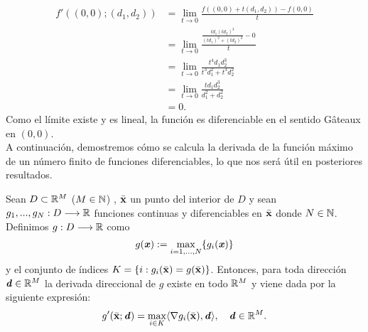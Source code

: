 \begin{equation*}
\begin{split}
f'((0,0); (d_1, d_2)) &= \lim_{t\rightarrow0}\frac{f((0,0)+t(d_1, d_2)) - f(0,0)}{t} \\
&=  \lim_{t\rightarrow0}\frac{\frac{td_1(td_2)^3}{(td_1)^2+(td_2)^2} - 0}{t} \\
&= \lim_{t\rightarrow0}\frac{t^4d_1d_2^3}{t^3d_1^2+t^3d_2^2} \\
&= \lim_{t\rightarrow0}\frac{td_1d_2^3}{d_1^2+d_2^2} \\
& = 0.
\end{split}
\end{equation*}
Como el límite existe y es lineal, la función es diferenciable en el sentido Gâteaux en $ (0,0) $. \\

A continuación, demostremos cómo se calcula la derivada de la función máximo de un número finito de funciones diferenciables, lo que nos será útil en posteriores resultados.
\bigskip
	\begin{proposicionBox}\label{dirDeriv}
		Sean $ D \subset \mathbb{R}^M$ ($ M \in \mathbb{N} $) , $ \bar{\mathbf{x}} $ un punto del interior de $ D $ y sean $ g_1, ..., g_N : D \longrightarrow \mathbb{R} $  funciones continuas y diferenciables en $ \bar{\mathbf{x}} $ donde $ N \in \mathbb{N} $. Definimos $ g:D \longrightarrow \mathbb{R} $ como \[ g(\textbf{\emph{x}}):=\max_{i=1,...,N}\{g_i(\textbf{\emph{x}})\} \] y el conjunto de índices $ K = \lbrace  i : g_i(\bar{\mathbf{x}}) =  g(\bar{\mathbf{x}}) \rbrace $. Entonces, para toda dirección $ \textbf{\emph{d}} \in \mathbb{R}^M $ la derivada direccional de $ g $ existe en todo $ \mathbb{R}^M $ y viene dada por la siguiente expresión:
		\begin{equation}
			g'(\bar{\mathbf{x}};\textbf{\emph{d}}) = \max_{i \in K} \langle \nabla g_i(\bar{\mathbf{x}}), \textbf{\emph{d}} \rangle, \quad \textbf{\emph{d}}\in\mathbb{R}^M.
		\end{equation}
	\end{proposicionBox}

